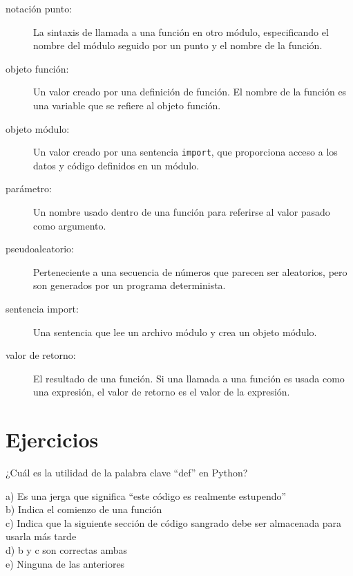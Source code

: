\begin{description}
\item[notación punto:] La sintaxis de llamada a una función en
otro módulo, especificando el nombre del módulo seguido por un punto y el
nombre de la función.

\item[objeto función:]  Un valor creado por una definición de función.
El nombre de la función es una variable que se refiere al objeto
función.

\item[objeto módulo:] Un valor creado por una sentencia {\tt import},
que proporciona acceso a los datos y código definidos en un módulo.

\item[parámetro:] Un nombre usado dentro de una función para referirse al valor
pasado como argumento.

\item[pseudoaleatorio:] Perteneciente a una secuencia de números que parecen
ser aleatorios, pero son generados por un programa determinista.

\item[sentencia import:] Una sentencia que lee un archivo módulo y crea
un objeto módulo.

\item[valor de retorno:] El resultado de una función. Si una llamada a una función
es usada como una expresión, el valor de retorno es el valor de la expresión.

\end{description}


\section{Ejercicios}

\begin{ex}
¿Cuál es la utilidad de la palabra clave ``def'' en Python?

a) Es una jerga que significa ``este código es realmente estupendo''\\
b) Indica el comienzo de una función\\
c) Indica que la siguiente sección de código sangrado debe ser almacenada para usarla más tarde\\
d) b y c son correctas ambas\\
e) Ninguna de las anteriores
\end{ex}

